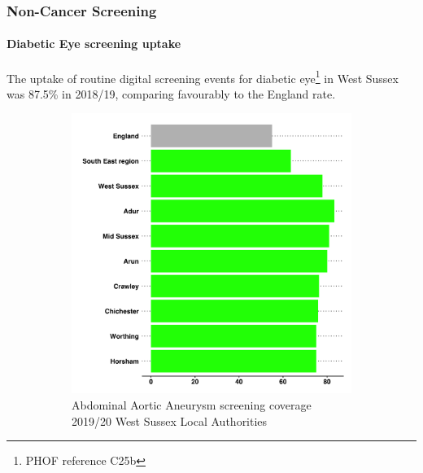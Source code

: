 \subsubsection{Non-Cancer Screening}
\paragraph{Diabetic Eye screening uptake}The uptake of routine digital screening events for diabetic eye\footnote{PHOF reference C25b} in West Sussex was 87.5\% in 2018/19, comparing favourably to the England rate.


\begin{figure}[H]
    \caption[Abdominal Aortic Aneurysm screening coverage]{{\bf Abdominal Aortic Aneurysm screening coverage} The screening coverage rate at county-level for abdominal aortic aneurysm\footnote{PHOF reference C25a} was 76.7\% in 2020/21, compared to 55.0\% in England overall.}
    \label{figure:aaa:screening}
    \centering
    \begin{subfigure}[b]{0.49\linewidth}
        \centering
        \includegraphics[width=\linewidth]{images/aaa_rag_bar.png}
        \caption{Abdominal Aortic Aneurysm screening coverage 2019/20 West Sussex Local Authorities}
        \label{fig:aaa:latest}
    \end{subfigure}
    \begin{subfigure}[b]{0.49\linewidth}

\end{subfigure}
\end{figure}
